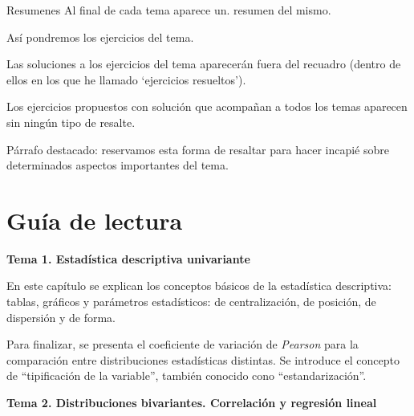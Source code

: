 \vspace{5mm} %
\begin{myblock}{Resumenes}
	Al final de cada tema aparece un. resumen del mismo.
\end{myblock}


\vspace{5mm} %
\begin{ejemplo}
\begin{ejre}
	Así pondremos los ejercicios del tema.
	
\end{ejre}
Las soluciones a los ejercicios del tema aparecerán fuera del recuadro (dentro de ellos en los que he llamado `ejercicios resueltos').
\end{ejemplo}

Los ejercicios propuestos con solución que acompañan a todos los temas aparecen sin ningún tipo de resalte.

\vspace{5mm} %
\begin{destacado}
Párrafo destacado: reservamos esta forma de resaltar para hacer incapié sobre determinados aspectos importantes del tema.

\end{destacado}


\section{Guía de lectura}

\textbf{Tema 1. Estadística descriptiva univariante}

\begin{adjustwidth}{50pt}{25pt}
En este capítulo se explican los conceptos básicos de la estadística descriptiva: tablas, gráficos y parámetros estadísticos: de centralización, de posición, de dispersión y de forma.

Para finalizar, se presenta el coeficiente de variación de \emph{Pearson} para la comparación entre distribuciones estadísticas distintas. Se introduce el concepto de  ``tipificación de la variable'', también conocido cono ``estandarización''.
\end{adjustwidth}

\textbf{Tema 2. Distribuciones bivariantes. Correlación y regresión lineal}

